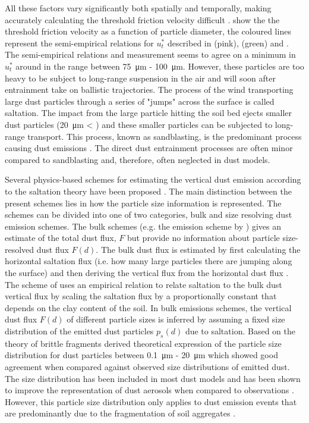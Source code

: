 All these factors vary significantly both spatially and temporally, making accurately calculating the threshold friction velocity difficult .  show the the threshold friction velocity as a function of particle diameter, the coloured lines represent the semi-empirical relations for $u^*_t$ described in \textcite{iversen1982saltation} (pink), \textcite{shao2000simple} (green) and \textcite{bagnold1941physics}.
The semi-empirical relations and measurement seems to agree on a minimum in $u^*_t$ around in the range between  \SI{75}{\micro\metre} - \SI{100}{\micro\metre}.
However, these particles are too heavy to be subject to long-range suspension in the air and will soon after entrainment take on ballistic trajectories.
The process of the wind transporting large dust particles through a series of "jumps" across the surface is called saltation. 
The impact from the large particle hitting the soil bed ejects smaller dust particles (\SI{20}{\micro\metre} < ) and 
these smaller particles can be subjected to long-range transport. This process, known as sandblasting, is the predominant process causing dust emissions \parencite{kok2012physics}. The direct dust entrainment processes are often minor compared to sandblasting and, therefore, often neglected in dust models.

Several physics-based schemes for estimating the vertical dust emission according to the saltation theory have been proposed \parencite{MB95_dust_emission,alfaro2001modeling,shao2004simplification}. 
The main distinction between the present schemes lies in how the particle size information is represented. The schemes can be divided into one of two categories, bulk and size resolving dust emission schemes.
The bulk schemes (e.g. the emission scheme by \parencite{MB95_dust_emission}) gives an estimate of the total dust flux, $F$ but provide no information about particle size-resolved dust flux $F(d)$. The bulk dust flux is estimated by first calculating the horizontal saltation flux (i.e. how many large particles there are jumping along the surface) and then deriving the vertical flux from the horizontal dust flux \parencite{tegen2014numerical}.
The scheme of \textcite{MB95_dust_emission} uses an empirical relation to relate saltation to the bulk dust vertical flux by scaling the saltation flux by a proportionally constant that depends on the clay content of the soil. In bulk emissions schemes, the vertical dust flux $F(d)$ of different particle sizes is inferred by assuming a fixed size distribution of the emitted dust particles $p_s(d)$ due to saltation.
Based on the theory of brittle fragments \textcite{kok_scaling_2011} derived theoretical expression of the particle size distribution for dust particles between \SI{0.1}{\micro\metre} - \SI{20}{\micro\metre} which showed good agreement when compared against observed size distributions of emitted dust. 
The \textcite{kok_scaling_2011} size distribution has been included in most dust models and has been shown to improve the representation of dust aerosols when compared to observations \parencite{johnson2012global}.
However, this particle size distribution only applies to dust emission events that are predominantly due to the fragmentation of soil aggregates \parencite{kok2012physics}.

